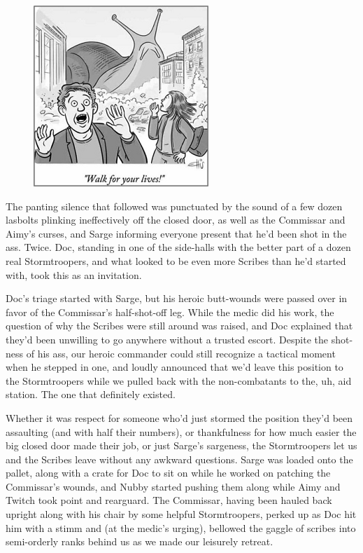 \begin{figure}
	\begin{center}
		\includegraphics[width=\figwidth]{pics/21/110.png}
	\end{center}
\end{figure}
The panting silence that followed was punctuated by the sound of a few dozen lasbolts plinking ineffectively off the closed door, as well as the Commissar and Aimy's curses, and Sarge informing everyone present that he'd been shot in the ass. 
Twice. 
Doc, standing in one of the side-halls with the better part of a dozen real Stormtroopers, and what looked to be even more Scribes than he'd started with, took this as an invitation. 


Doc's triage started with Sarge, but his heroic butt-wounds were passed over in favor of the Commissar's half-shot-off leg. 
While the medic did his work, the question of why the Scribes were still around was raised, and Doc explained that they'd been unwilling to go anywhere without a trusted escort. 
Despite the shot-ness of his ass, our heroic commander could still recognize a tactical moment when he stepped in one, and loudly announced that we'd leave this position to the Stormtroopers while we pulled back with the non-combatants to the, uh, aid station. 
The one that definitely existed.

Whether it was respect for someone who'd just stormed the position they'd been assaulting (and with half their numbers), or thankfulness for how much easier the big closed door made their job, or just Sarge's sargeness, the Stormtroopers let us and the Scribes leave without any awkward questions. 
Sarge was loaded onto the pallet, along with a crate for Doc to sit on while he worked on patching the Commissar's wounds, and Nubby started pushing them along while Aimy and Twitch took point and rearguard. 
The Commissar, having been hauled back upright along with his chair by some helpful Stormtroopers, perked up as Doc hit him with a stimm and (at the medic's urging), bellowed the gaggle of scribes into semi-orderly ranks behind us as we made our leisurely retreat.

